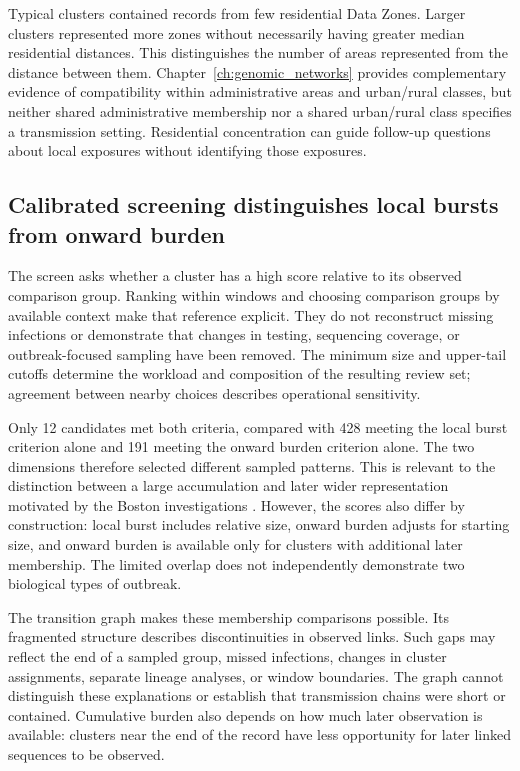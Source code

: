 Typical clusters contained records from few residential Data Zones. Larger clusters represented more zones without necessarily having greater median residential distances. This distinguishes the number of areas represented from the distance between them. Chapter~\ref{ch:genomic_networks} provides complementary evidence of compatibility within administrative areas and urban/rural classes, but neither shared administrative membership nor a shared urban/rural class specifies a transmission setting. Residential concentration can guide follow-up questions about local exposures without identifying those exposures.

\subsection{Calibrated screening distinguishes local bursts from onward burden}\label{sec:ch5_discussion_screening}

The screen asks whether a cluster has a high score relative to its observed comparison group. Ranking within windows and choosing comparison groups by available context make that reference explicit. They do not reconstruct missing infections or demonstrate that changes in testing, sequencing coverage, or outbreak-focused sampling have been removed. The minimum size and upper-tail cutoffs determine the workload and composition of the resulting review set; agreement between nearby choices describes operational sensitivity.

Only 12 candidates met both criteria, compared with 428 meeting the local burst criterion alone and 191 meeting the onward burden criterion alone. The two dimensions therefore selected different sampled patterns. This is relevant to the distinction between a large accumulation and later wider representation motivated by the Boston investigations \citep{Lemieux2021}. However, the scores also differ by construction: local burst includes relative size, onward burden adjusts for starting size, and onward burden is available only for clusters with additional later membership. The limited overlap does not independently demonstrate two biological types of outbreak.

The transition graph makes these membership comparisons possible. Its fragmented structure describes discontinuities in observed links. Such gaps may reflect the end of a sampled group, missed infections, changes in cluster assignments, separate lineage analyses, or window boundaries. The graph cannot distinguish these explanations or establish that transmission chains were short or contained. Cumulative burden also depends on how much later observation is available: clusters near the end of the record have less opportunity for later linked sequences to be observed.

